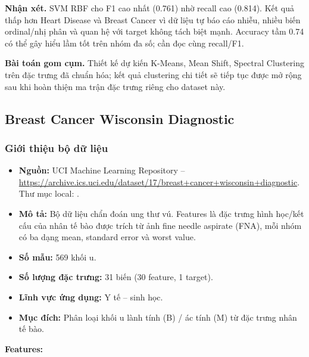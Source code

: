 \textbf{Nhận xét.} SVM RBF cho F1 cao nhất (0.761) nhờ recall cao (0.814). Kết quả thấp hơn Heart Disease và Breast Cancer vì dữ liệu tự báo cáo nhiễu, nhiều biến ordinal/nhị phân và quan hệ với target không tách biệt mạnh. Accuracy tầm 0.74 có thể gây hiểu lầm tốt trên nhóm đa số; cần đọc cùng recall/F1.

\textbf{Bài toán gom cụm.} Thiết kế dự kiến K-Means, Mean Shift, Spectral Clustering trên đặc trưng đã chuẩn hóa; kết quả clustering chi tiết sẽ tiếp tục được mở rộng sau khi hoàn thiện ma trận đặc trưng riêng cho dataset này.

\subsection{Breast Cancer Wisconsin Diagnostic}

\subsubsection{Giới thiệu bộ dữ liệu}

\begin{itemize}
 \item \textbf{Nguồn:} UCI Machine Learning Repository -- \url{https://archive.ics.uci.edu/dataset/17/breast+cancer+wisconsin+diagnostic}. Thư mục local: .
 \item \textbf{Mô tả:} Bộ dữ liệu chẩn đoán ung thư vú. Features là đặc trưng hình học/kết cấu của nhân tế bào được trích từ ảnh fine needle aspirate (FNA), mỗi nhóm có ba dạng mean, standard error và worst value.
 \item \textbf{Số mẫu:} 569 khối u.
 \item \textbf{Số lượng đặc trưng:} 31 biến (30 feature, 1 target).
 \item \textbf{Lĩnh vực ứng dụng:} Y tế -- sinh học.
 \item \textbf{Mục đích:} Phân loại khối u lành tính (B) / ác tính (M) từ đặc trưng nhân tế bào.
\end{itemize}

\textbf{Features:}

